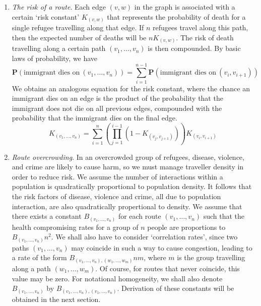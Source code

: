 \documentclass{article}
\begin{document}
\begin{enumerate}
    \item {\it The risk of a route}. Each edge $(v,w)$ in the graph is associated with a certain `risk constant' $K_{(v,w)}$ that represents the probability of death for a single refugee travelling along that edge. If $n$ refugees travel along this path, then the expected number of deaths will be $n K_{(v,w)}$. The risk of death travelling along a certain path $(v_1, \dots, v_n)$ is then compounded. By basic laws of probability, we have
    \[ \mathbf{P}(\text{immigrant dies on}\ (v_1, \dots, v_n)) = \sum_{i = 1}^{n-1} \mathbf{P}(\text{immigrant dies on}\ (v_i, v_{i+1})) \]
    We obtains an analogous equation for the risk constant, where the chance an immigrant dies on an edge is the product of the probability that the immigrant does not die on all previous edges, compounded with the probability that the immigrant dies on the final edge.
    \[ K_{(v_1, \dots, v_n)} = \sum_{i = 1}^n \left( \prod_{j = 1}^{i-1} \left(1 - K_{(v_j,v_{j+1})} \right) \right) K_{(v_i, v_{i+1})} \]

    \item {\it Route overcrowding}. In an overcrowded group of refugees, disease, violence, and crime are likely to cause harm, so we must manage traveller density in order to reduce risk. We assume the number of interactions within a population is quadratically proportional to population density. It follows that the risk factors of disease, violence and crime, all due to population interaction, are also quadratically propertional to density. We assume that there exists a constant $B_{(v_1, \dots, v_n)}$ for each route $(v_1, \dots, v_n)$ such that the health compromising rates for a group of $n$ people are proportions to $B_{(v_1, \dots, v_n)} n^2$. We shall also have to consider `correlation rates', since two paths $(v_1, \dots, v_n)$ may coincide in such a way to cause congestion, leading to a rate of the form $B_{(v_1, \dots, v_n), (w_1, \dots, w_m)} n m$, where $m$ is the group travelling along a path $(w_1, \dots, w_m)$. Of course, for routes that never coincide, this value may be zero. For notational homogeneity, we shall also denote $B_{(v_1, \dots, v_n)}$ by $B_{(v_1, \dots, v_n), (v_1, \dots, v_n)}$. Derivation of these constants will be obtained in the next section.
\end{enumerate}
\end{document}
